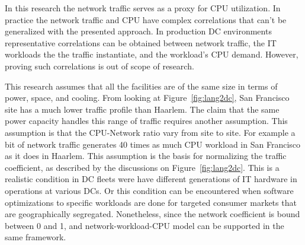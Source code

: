 

In this research the network traffic serves as a proxy for CPU utilization. In practice the network traffic and CPU have complex correlations that can't be generalized with the presented approach. In production DC environments representative correlations can be obtained between network traffic, the IT workloads the the traffic instantiate, and the workload's CPU demand. However, proving such correlations is out of scope of research. 

This research assumes that all the facilities are of the same size in terms of power, space, and cooling. From looking at Figure~\ref{fig:lang2dc}, San Francisco site has a much lower traffic profile than Haarlem. The claim that the same power capacity handles this range of traffic requires another assumption. This assumption is that the CPU-Network ratio vary from site to site. For example a bit of network traffic generates 40 times as much CPU workload in San Francisco as it does in Haarlem. This assumption is the basis for normalizing the traffic coefficient, as described by the discussions on Figure~\ref{fig:lang2dc}. This is a realistic condition in DC fleets were have different generations of IT hardware in operations at various DCs. Or this condition can be encountered when software optimizations to specific workloads are done for targeted consumer markets that are geographically segregated. Nonetheless, since the network coefficient is bound between 0 and 1, and network-workload-CPU model can be supported in the same framework. 

